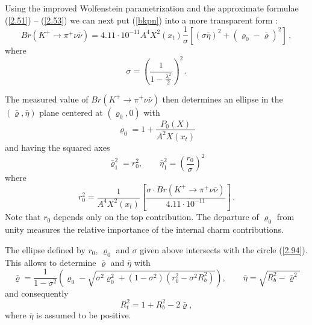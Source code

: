 Using the improved Wolfenstein parametrization and the approximate
formulae (\ref{2.51}) -- (\ref{2.53}) we can next put 
(\ref{bkpn}) into a more transparent form \cite{BLO}:
\begin{equation}\label{108}
Br(K^{+} \to \pi^{+} \nu \bar\nu) = 4.11 \cdot 10^{-11} A^4 X^2(x_t)
\frac{1}{\sigma} \left[ (\sigma \bar\eta)^2 +
\left(\varrho_0 - \bar\varrho \right)^2 \right]\,,
\end{equation}
where
\begin{equation}\label{109}
\sigma = \left( \frac{1}{1- \frac{\lambda^2}{2}} \right)^2\,.
\end{equation}

The measured value of $Br(K^{+} \to \pi^{+} \nu \bar\nu)$ then
determines  an ellipse in the $(\bar\varrho,\bar\eta)$ plane  centered at
$(\varrho_0,0)$ with 
%
\begin{equation}\label{110}
\varrho_0 = 1 + \frac{P_0(X)}{A^2 X(x_t)}
\end{equation}
%
and having the squared axes
%
\begin{equation}\label{110a}
\bar\varrho_1^2 = r^2_0, \qquad \bar\eta_1^2 = \left( \frac{r_0}{\sigma}
\right)^2
\end{equation}
%
where
%
\begin{equation}\label{111}
r^2_0 = \frac{1}{A^4 X^2(x_t)} \left[
\frac{\sigma \cdot Br(K^{+} \to \pi^{+} \nu \bar\nu)}
{4.11 \cdot 10^{-11}} \right]\,.
\end{equation}
%
Note that $r_0$ depends only on the top contribution.
The departure of $\varrho_0$ from unity measures the relative importance
of the internal charm contributions.

The ellipse defined by $r_0$, $\varrho_0$ and $\sigma$ given above
intersects with the circle (\ref{2.94}).  This allows to determine
$\bar\varrho$ and $\bar\eta$  with 
\begin{equation}\label{113}
\bar\varrho = \frac{1}{1-\sigma^2} \left( \varrho_0 - \sqrt{\sigma^2
\varrho_0^2 +(1-\sigma^2)(r_0^2-\sigma^2 R_b^2)} \right), \qquad
\bar\eta = \sqrt{R_b^2 -\bar\varrho^2}
\end{equation}
%
and consequently
%
\begin{equation}\label{113aa}
R_t^2 = 1+R_b^2 - 2 \bar\varrho,
\end{equation}
%
where $\bar\eta$ is assumed to be positive.

